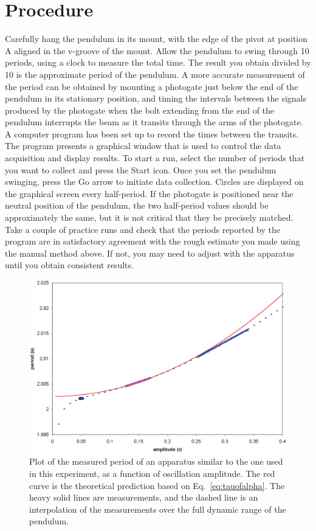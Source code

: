 \documentclass{revtex4}
\begin{document}
\section{Procedure}
\label{sec:procedure}
Carefully hang the pendulum in its mount, with the edge of the pivot at
position A aligned in the v-groove of the mount.  Allow the pendulum to
swing through 10 periods, using a clock to measure the total time.  The
result you obtain divided by 10 is the approximate period of the pendulum.
A more accurate measurement of the period can be obtained by mounting a
photogate just below the end of the pendulum in its stationary position,
and timing the intervals between the signals produced by the photogate
when the bolt extending from the end of the pendulum interrupts the beam
as it transits through the arms of the photogate.  A computer program has
been set up to record the times between the transits.  The program presents
a graphical window that is used to control the data acquisition and display
results.  To start a run, select the number of periods that you want to
collect and press the Start icon.  Once you set the pendulum swinging,
press the Go arrow to initiate data collection.  Circles are displayed on
the graphical screen every half-period.  If the photogate is positioned
near the neutral position of the pendulum, the two half-period values 
should be approximately the same, but it is not critical that they be
precisely matched.  Take a couple of practice runs and check that the
periods reported by the program are in satisfactory agreement with the
rough estimate you made using the manual method above.  If not, you may
need to adjust with the apparatus until you obtain consistent results.

\begin{figure}
\includegraphics[width=6in]{penduap.eps}
\caption{\label{fig:penduap}
Plot of the measured period of an apparatus similar to the one used in
this experiment, as a function of oscillation amplitude.  The red curve
is the theoretical prediction based on Eq.~\ref{eq:tauofalpha}.  The heavy
solid lines are measurements, and the dashed line is an interpolation
of the measurements over the full dynamic range of the pendulum.
}
\end{figure}
\end{document}
